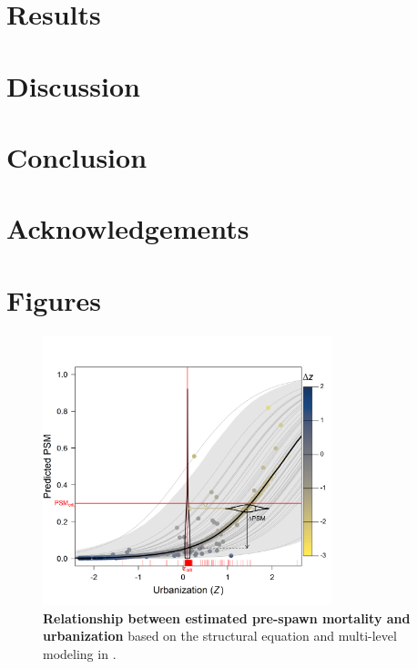\documentclass{article}
\begin{document}
\section*{Results}
\section*{Discussion}
\section*{Conclusion}

\section*{Acknowledgements}
\section* {Figures}


\begin{figure}[h!]
\centering
\noindent \includegraphics[width=0.75\textwidth]{..//analysis/results/figures/psm_z_threshold.png}
\caption{\textbf{Relationship between estimated pre-spawn mortality and urbanization} based on the structural equation and multi-level modeling in \citep{feist2017}.}
\label{fig:psmz}
\end{figure}

\end{document}
